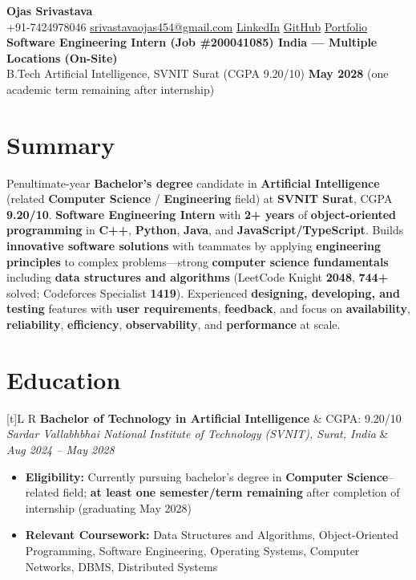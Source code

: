 \documentclass[a4paper,10pt]{article}
\newcommand{\resumeSubheading}[4]{%
  \vspace{0.5mm}
  \noindent
  \begin{tabularx}{\textwidth}[t]{L R}
    \textbf{#1} & #4 \\
    \textit{#3} & \textit{#2} \\
  \end{tabularx}
  \vspace{-0.5mm}%
}
\begin{document}
\selectfont

\begin{center}
  {\LARGE \textbf{Ojas Srivastava}} \\[1mm]
  \small
  +91-7424978046 \textbar{}
  \href{mailto:srivastavaojas454@gmail.com}{srivastavaojas454@gmail.com} \textbar{}
  \href{https://linkedin.com/in/ojas-srivastava05}{LinkedIn} \textbar{}
  \href{https://github.com/Ojas-Srivastava05}{GitHub} \textbar{}
  \href{https://ojas-srivastava.vercel.app}{Portfolio} \\[0.5mm]
  \textbf{Software Engineering Intern (Job \#200041085) \textbar{} India --- Multiple Locations (On-Site)} \\[0.3mm]
  B.Tech Artificial Intelligence, SVNIT Surat (CGPA 9.20/10) \textbar{}
  \textbf{May 2028} (one academic term remaining after internship)
\end{center}

\vspace{-1mm}

\section{Summary}
\small
Penultimate-year \textbf{Bachelor's degree} candidate in \textbf{Artificial Intelligence} (related \textbf{Computer Science} / \textbf{Engineering} field) at \textbf{SVNIT Surat}, CGPA \textbf{9.20/10}. \textbf{Software Engineering Intern} with \textbf{2+ years} of \textbf{object-oriented programming} in \textbf{C++}, \textbf{Python}, \textbf{Java}, and \textbf{JavaScript/TypeScript}. Builds \textbf{innovative software solutions} with teammates by applying \textbf{engineering principles} to complex problems---strong \textbf{computer science fundamentals} including \textbf{data structures and algorithms} (LeetCode Knight \textbf{2048}, \textbf{744+} solved; Codeforces Specialist \textbf{1419}). Experienced \textbf{designing, developing, and testing} features with \textbf{user requirements}, \textbf{feedback}, and focus on \textbf{availability}, \textbf{reliability}, \textbf{efficiency}, \textbf{observability}, and \textbf{performance} at scale.

\section{Education}
\small
\resumeSubheading
  {Bachelor of Technology in Artificial Intelligence}{Aug 2024 -- May 2028}
  {Sardar Vallabhbhai National Institute of Technology (SVNIT), Surat, India}{CGPA: 9.20/10}
\begin{itemize}
  \item \textbf{Eligibility:} Currently pursuing bachelor's degree in \textbf{Computer Science}--related field; \textbf{at least one semester/term remaining} after completion of internship (graduating May 2028)
  \item \textbf{Relevant Coursework:} Data Structures and Algorithms, Object-Oriented Programming, Software Engineering, Operating Systems, Computer Networks, DBMS, Distributed Systems
\end{itemize}
\end{document}

